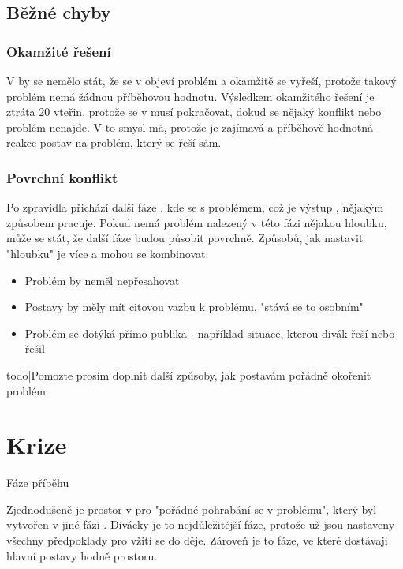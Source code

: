 \documentclass[main.tex]{subfiles}
\begin{document}
\subsection{ Běžné chyby }  
\subsubsection{ Okamžité řešení } V  by se nemělo stát, že se v  objeví problém a okamžitě se vyřeší, protože takový problém nemá žádnou příběhovou hodnotu. Výsledkem okamžitého řešení je ztráta 20 vteřin, protože se v  musí pokračovat, dokud se nějaký konflikt nebo problém nenajde. V  to smysl má, protože je zajímavá a příběhově hodnotná reakce postav na problém, který se řeší sám. 
 
\subsubsection{ Povrchní konflikt } Po  zpravidla přichází další fáze , kde se s problémem, což je výstup , nějakým způsobem pracuje. Pokud nemá problém nalezený v této fázi nějakou hloubku, může se stát, že další fáze  budou působit povrchně. Způsobů, jak nastavit "hloubku"{} je více a mohou se kombinovat: 
 
\begin{itemize}
\item  Problém by neměl nepřesahovat  
\item  Postavy by měly mít citovou vazbu k problému, "stává se to osobním"
\item  Problém se dotýká přímo publika - například situace, kterou divák řeší nebo řešil
\end{itemize}
 
{{todo|Pomozte prosím doplnit další způsoby, jak postavám pořádně okořenit problém}} 
 
  
 
 
 
\needspace{5cm} \section{Krize} \label{krize} {{Fáze příběhu}} 
 
Zjednodušeně je  prostor v  pro "pořádné pohrabání se v problému", který byl vytvořen v jiné fázi . Divácky je to nejdůležitější fáze, protože už jsou nastaveny všechny předpoklady pro vžití se do děje. Zároveň je to fáze, ve které dostávaji hlavní postavy hodně prostoru. 
 
\end{document}
